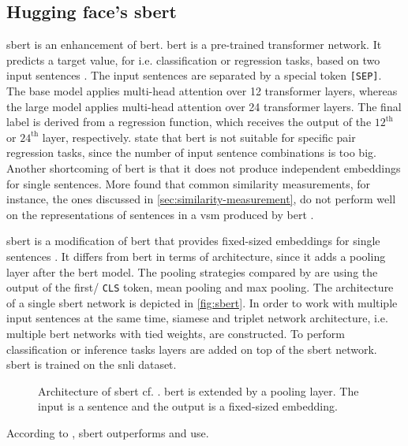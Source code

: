 \subsection{Hugging face's \acs{sbert}}\label{subsec:hf-sent-ransformers}

\ac{sbert} is an enhancement of \ac{bert}.
\ac{bert} is a pre-trained transformer network.
It predicts a target value, for i.e. classification or regression tasks, based on two input sentences \cite{HfsentTrans2019}.
The input sentences are separated by a special token \texttt{[SEP]}.
The base model applies multi-head attention over 12 transformer layers, whereas the large model applies multi-head attention over 24 transformer layers.
The final label is derived from a regression function, which receives the output of the $12^\text{th}$ or $24^\text{th}$ layer, respectively.
\citeauthor{HfsentTrans2019} state that \ac{bert} is not suitable for specific pair regression tasks, 
since the number of input sentence combinations is too big.
Another shortcoming of \ac{bert} is that it does not produce independent embeddings for single sentences.
More \citeauthor{HfsentTrans2019} found that common similarity measurements, for instance, the ones discussed in \autoref{sec:similarity-measurement}, 
do not perform well on the representations of sentences in a \ac{vsm} produced by \ac{bert} \cite{HfsentTrans2019}.

\ac{sbert} is a modification of \ac{bert} that provides fixed-sized embeddings for single sentences \cite{HfsentTrans2019}.
It differs from \ac{bert} in terms of architecture, since it adds a pooling layer after the \ac{bert} model.
The pooling strategies compared by \citeauthor{HfsentTrans2019} are using the output of the first/ \texttt{CLS} token, mean pooling and max pooling.
The architecture of a single \ac{sbert} network is depicted in \autoref{fig:sbert}.
In order to work with multiple input sentences at the same time, siamese and triplet network architecture, 
i.e. multiple \ac{bert} networks with tied weights, are constructed.
To perform classification or inference tasks layers are added on top of the \ac{sbert} network.
\ac{sbert} is trained on the \ac{snli} dataset.

\begin{figure}[htp] %
    \centering
    
    \caption{Architecture of \ac{sbert} cf. \cite{HfsentTrans2019}.
    \ac{bert} is extended by a pooling layer.
    The input is a sentence and the output is a fixed-sized embedding.
    }
    \label{fig:sbert}
\end{figure}

According to \citeauthor{HfsentTrans2019}, \ac{sbert} outperforms \infersent{} and \ac{use}.